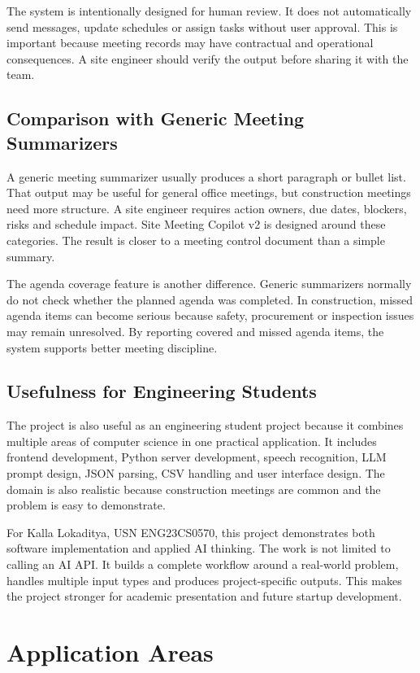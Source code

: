 \documentclass[11pt,a4paper]{article}
\begin{document}
The system is intentionally designed for human review. It does not automatically send messages, update schedules or assign tasks without user approval. This is important because meeting records may have contractual and operational consequences. A site engineer should verify the output before sharing it with the team.

\subsection{Comparison with Generic Meeting Summarizers}

A generic meeting summarizer usually produces a short paragraph or bullet list. That output may be useful for general office meetings, but construction meetings need more structure. A site engineer requires action owners, due dates, blockers, risks and schedule impact. Site Meeting Copilot v2 is designed around these categories. The result is closer to a meeting control document than a simple summary.

The agenda coverage feature is another difference. Generic summarizers normally do not check whether the planned agenda was completed. In construction, missed agenda items can become serious because safety, procurement or inspection issues may remain unresolved. By reporting covered and missed agenda items, the system supports better meeting discipline.

\subsection{Usefulness for Engineering Students}

The project is also useful as an engineering student project because it combines multiple areas of computer science in one practical application. It includes frontend development, Python server development, speech recognition, LLM prompt design, JSON parsing, CSV handling and user interface design. The domain is also realistic because construction meetings are common and the problem is easy to demonstrate.

For Kalla Lokaditya, USN ENG23CS0570, this project demonstrates both software implementation and applied AI thinking. The work is not limited to calling an AI API. It builds a complete workflow around a real-world problem, handles multiple input types and produces project-specific outputs. This makes the project stronger for academic presentation and future startup development.

\section{Application Areas}
\end{document}
